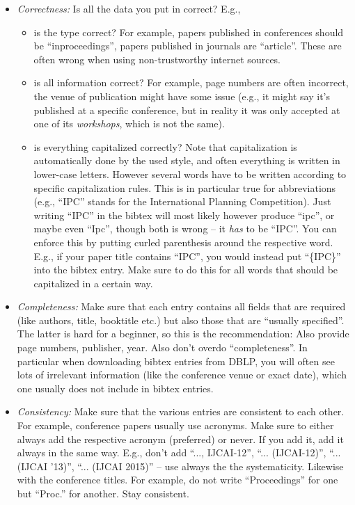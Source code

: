 \begin{itemize}
  \item \emph{Correctness:} Is all the data you put in correct? E.g.,
  \begin{itemize}
    \item is the type correct? For example, papers published in conferences should be ``inproceedings'', papers published in journals are ``article''. These are often wrong when using non-trustworthy internet sources.
    \item is all information correct? For example, page numbers are often incorrect, the venue of publication might have some issue (e.g., it might say it's published at a specific conference, but in reality it was only accepted at one of its \emph{workshops}, which is not the same).
    \item is everything capitalized correctly? Note that capitalization is automatically done by the used style, and often everything is written in lower-case letters. However several words have to be written according to specific capitalization rules. This is in particular true for abbreviations (e.g., ``IPC'' stands for the International Planning Competition). Just writing ``IPC'' in the bibtex will most likely however produce ``ipc'', or maybe even ``Ipc'', though both is wrong -- it \emph{has} to be ``IPC''. You can enforce this by putting curled parenthesis around the respective word. E.g., if your paper title contains ``IPC'', you would instead put ``\{IPC\}'' into the bibtex entry. Make sure to do this for all words that should be capitalized in a certain way.
  \end{itemize}

   
  \item \emph{Completeness:} Make sure that each entry contains all fields that are required (like authors, title, booktitle etc.) but also those that are ``usually specified''. The latter is hard for a beginner, so this is the recommendation: Also provide page numbers, publisher, year. Also don't overdo ``completeness''. In particular when downloading bibtex entries from DBLP, you will often see lots of irrelevant information (like the conference venue or exact date), which one usually does not include in bibtex entries.
  \item \emph{Consistency:} Make sure that the various entries are consistent to each other. For example, conference papers usually use acronyms. Make sure to either always add the respective acronym (preferred) or never. If you add it, add it always in the same way. E.g., don't add ``..., IJCAI-12'', ``... (IJCAI-12)'', ``... (IJCAI '13)'', ``... (IJCAI 2015)'' -- use always the the systematicity. Likewise with the conference titles. For example, do not write ``Proceedings'' for one but ``Proc.'' for another. Stay consistent.
\end{itemize}
    
